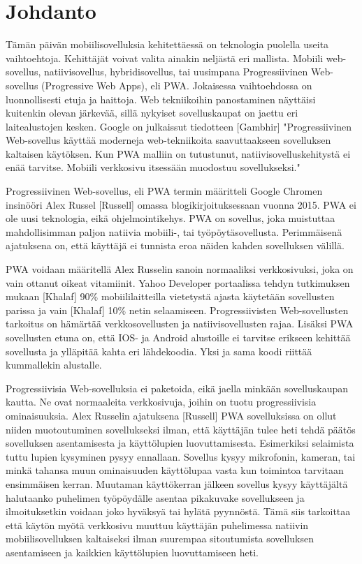 \documentclass{tktltiki}
\begin{document}
\mytableofcontents

\section{Johdanto}

Tämän päivän mobiilisovelluksia kehitettäessä on teknologia puolella useita vaihtoehtoja. Kehittäjät voivat valita ainakin neljästä eri mallista. Mobiili web-sovellus, natiivisovellus, hybridisovellus, tai uusimpana Progressiivinen Web-sovellus (Progressive Web Apps), eli PWA. Jokaisessa vaihtoehdossa on luonnollisesti etuja ja haittoja. Web tekniikoihin panostaminen näyttäisi kuitenkin olevan järkevää, sillä nykyiset sovelluskaupat on jaettu eri laitealustojen kesken. Google on julkaissut tiedotteen [Gambhir] "Progressiivinen Web-sovellus käyttää moderneja web-tekniikoita saavuttaakseen sovelluksen kaltaisen käytöksen. Kun PWA malliin on tutustunut, natiivisovelluskehitystä ei enää tarvitse. Mobiili verkkosivu itsessään muodostuu sovellukseksi."

Progressiivinen Web-sovellus, eli PWA termin määritteli Google Chromen insinööri Alex Russel [Russell] omassa blogikirjoituksessaan vuonna 2015. PWA ei ole uusi teknologia, eikä ohjelmointikehys. PWA on sovellus, joka muistuttaa mahdollisimman paljon natiivia mobiili-, tai työpöytäsovellusta. Perimmäisenä ajatuksena on, että käyttäjä ei tunnista eroa näiden kahden sovelluksen välillä.

PWA voidaan määritellä Alex Russelin sanoin normaaliksi verkkosivuksi, joka on vain ottanut oikeat vitamiinit. Yahoo Developer portaalissa tehdyn tutkimuksen mukaan [Khalaf] 90\% mobiililaitteilla vietetystä ajasta käytetään sovellusten parissa ja vain [Khalaf] 10\% netin selaamiseen. Progressiivisten Web-sovellusten tarkoitus on hämärtää verkkosovellusten ja natiivisovellusten rajaa. Lisäksi PWA sovellusten etuna on, että IOS- ja Android alustoille ei tarvitse erikseen kehittää sovellusta ja ylläpitää kahta eri lähdekoodia. Yksi ja sama koodi riittää kummallekin alustalle. 

Progressiivisia  Web-sovelluksia ei paketoida, eikä jaella minkään sovelluskaupan kautta. Ne ovat normaaleita verkkosivuja, joihin on tuotu progressiivisia ominaisuuksia. Alex  Russelin ajatuksena [Russell] PWA sovelluksissa on ollut niiden muotoutuminen sovellukseksi ilman, että käyttäjän tulee heti tehdä päätös sovelluksen asentamisesta ja käyttölupien luovuttamisesta. Esimerkiksi selaimista tuttu lupien kysyminen pysyy ennallaan. Sovellus kysyy mikrofonin, kameran, tai minkä tahansa muun ominaisuuden käyttölupaa vasta kun toimintoa tarvitaan ensimmäisen kerran. Muutaman käyttökerran jälkeen sovellus kysyy käyttäjältä halutaanko puhelimen työpöydälle asentaa pikakuvake sovellukseen ja ilmoituksetkin voidaan joko hyväksyä tai hylätä pyynnöstä. Tämä siis tarkoittaa että käytön myötä verkkosivu muuttuu käyttäjän puhelimessa natiivin mobiilisovelluksen kaltaiseksi ilman suurempaa sitoutumista sovelluksen asentamiseen ja kaikkien käyttölupien luovuttamiseen heti. 
\end{document}
